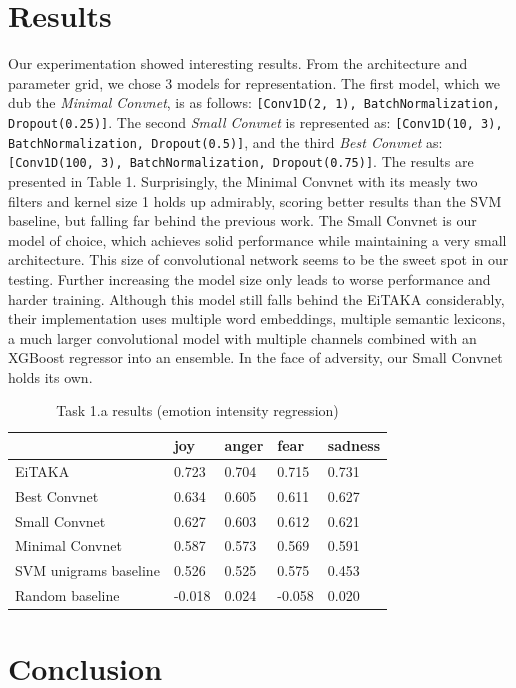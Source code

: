 \documentclass[10pt, a4paper]{article}
\begin{document}

\section{Results}
Our experimentation showed interesting results. 
From the architecture and parameter grid, we chose 3 models for representation.
The first model, which we dub the \textit{Minimal Convnet}, is as follows:
\texttt{[Conv1D(2, 1), BatchNormalization, Dropout(0.25)]}.
The second \textit{Small Convnet} is represented as: 
\texttt{[Conv1D(10, 3), BatchNormalization, Dropout(0.5)]}, and the third 
\textit{Best Convnet} as: 
\texttt{[Conv1D(100, 3), BatchNormalization, Dropout(0.75)]}.
The results are presented in Table 1.
Surprisingly, the Minimal Convnet with its measly two filters 
and kernel size 1 holds up admirably, scoring
better results than the SVM baseline, but falling far behind the 
previous work.
The Small Convnet is our model of choice, which achieves solid 
performance while maintaining a very small architecture.
This size of convolutional network seems to be the sweet spot in our testing.
Further increasing the model size only leads to worse performance and 
harder training.
Although this model still falls behind the EiTAKA considerably, their
implementation uses multiple word embeddings, multiple semantic lexicons,
a much larger convolutional model with multiple channels combined with an
XGBoost regressor into an ensemble.
In the face of adversity, our Small Convnet holds its own.


\begin{table}
\caption{Task 1.a results (emotion intensity regression)}
\label{tab:narrow-table}
\begin{center}
\begin{tabular}{lllll}
\toprule
& joy & anger & fear & sadness \\
\midrule
EiTAKA    & 0.723  & 0.704 & 0.715 & 0.731 \\
Best Convnet & 0.634 & 0.605 & 0.611 & 0.627 \\
Small Convnet & 0.627 & 0.603 & 0.612 & 0.621 \\
Minimal Convnet & 0.587 & 0.573 & 0.569 & 0.591 \\
SVM unigrams baseline & 0.526 & 0.525 & 0.575 & 0.453 \\
Random baseline & -0.018 & 0.024 & -0.058 & 0.020 \\
\bottomrule
\end{tabular}
\end{center}
\end{table}


\section{Conclusion}




 
\end{document}
